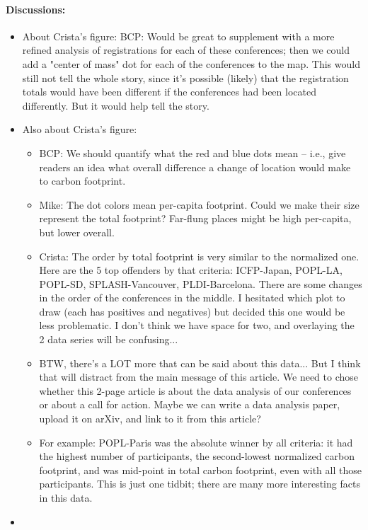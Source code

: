 \documentclass[12pt]{article}
\begin{document}
\paragraph*{Discussions:}
\begin{itemize}
\item 
About Crista’s figure:
BCP: Would be great to supplement with a more refined analysis of registrations for each of these conferences; then we could add a "center of mass" dot for each of the conferences to the map. This would still not tell the whole story, since it's possible (likely) that the registration totals would have been different if the conferences had been located differently. But it would help tell the story.
\item 
Also about Crista’s figure:
\begin{itemize}
\item 
BCP: We should quantify what the red and blue dots mean -- i.e., give readers an idea what overall difference a change of location would make to carbon footprint.
\item Mike: The dot colors mean per-capita footprint. Could we make their size represent the total footprint? Far-flung places might be high per-capita, but lower overall.
\item Crista: The order by total footprint is very similar to the normalized one. Here are the 5 top offenders by that criteria: ICFP-Japan, POPL-LA, POPL-SD, SPLASH-Vancouver, PLDI-Barcelona. There are some changes in the order of the conferences in the middle. I hesitated which plot to draw (each has positives and negatives) but decided this one would be less problematic. I don't think we have space for two, and overlaying the 2 data series will be confusing...
\item BTW, there's a LOT more that can be said about this data... But I think that will distract from the main message of this article. We need to chose whether this 2-page article is about the data analysis of our conferences or about a call for action. Maybe we can write a data analysis paper, upload it on arXiv, and link to it from this article?
\item
For example: POPL-Paris was the absolute winner by all criteria: it had the highest number of participants, the second-lowest normalized carbon footprint, and was mid-point in total carbon footprint, even with all those participants.
This is just one tidbit; there are many more interesting facts in this data.
\end{itemize}
\item 

\end{itemize}
\end{document}

